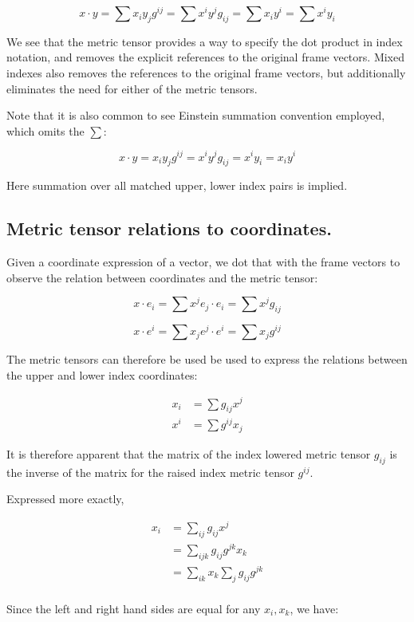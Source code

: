 \documentclass{article}      %
\begin{document}
\[
x \cdot y = \sum x_i y_j g^{ij} = \sum x^i y^j g_{ij} = \sum x_i y^i = \sum x^i y_i
\]

We see that the metric tensor provides a way to specify the dot product in index notation, and removes the explicit references to the original frame vectors.  Mixed indexes also removes the references to the original frame vectors, but additionally eliminates the need for either of the metric tensors.

Note that it is also common to see Einstein summation convention employed, which omits the $\sum$:

\[
x \cdot y = x_i y_j g^{ij} = x^i y^j g_{ij} = x^i y_i = x_i y^i
\]

Here summation over all matched upper, lower index pairs is implied.

\subsection{ Metric tensor relations to coordinates. }

Given a coordinate expression of a vector, we dot that with the frame vectors to observe the relation between coordinates and the metric tensor:

\[
x \cdot e_i = \sum x^j e_j \cdot e_i = \sum x^j g_{ij}
\]

\[
x \cdot e^i = \sum x_j e^j \cdot e^i = \sum x_j g^{ij}
\]

The metric tensors can therefore be used be used to express the relations between the upper and lower index coordinates:

\begin{align}
x_i &= \sum g_{ij} x^j \label{eqn:metric_upper_to_lower} \\
x^i &= \sum g^{ij} x_j \label{eqn:metric_lower_to_upper}
\end{align}

It is therefore apparent that the matrix of the index lowered metric tensor $g_{ij}$ is the inverse of the matrix for the raised index metric tensor $g^{ij}$.

Expressed more exactly, 

\begin{align*}
x_i
&= \sum_{ij} g_{ij} x^j \\
&= \sum_{ijk} g_{ij} g^{jk} x_k \\
&= \sum_{ik} x_k \sum_j g_{ij} g^{jk} \\
\end{align*}

Since the left and right hand sides are equal for any $x_i, x_k$, we have:
\end{document}
